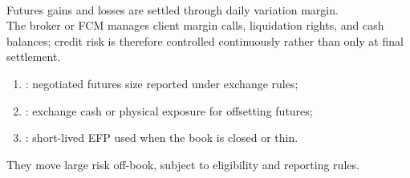 \begin{mechanism} \\
Futures gains and losses are settled through daily variation margin.\\
The broker or FCM manages client margin calls, liquidation rights, and cash balances; credit risk is therefore controlled continuously rather than only at final settlement.
\end{mechanism}

\begin{taxonomy} 
\begin{enumerate}[label=\roman*.]
\setlength{\itemsep}{0pt}
\item {}: negotiated futures size reported under exchange rules;
\item {}: exchange cash or physical exposure for offsetting futures;
\item {}: short-lived EFP used when the book is closed or thin.
\end{enumerate}
They move large risk off-book, subject to eligibility and reporting rules.
\end{taxonomy}
